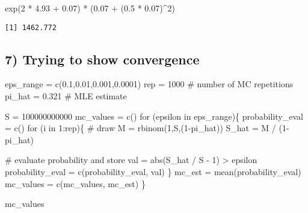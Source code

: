 \documentclass[
  letterpaper,
  DIV=11,
  numbers=noendperiod]{scrartcl}
\newenvironment{Shaded}{\begin{snugshade}}{\end{snugshade}}
\newcommand{\CommentTok}[1]{\textcolor[rgb]{0.37,0.37,0.37}{#1}}
\newcommand{\ControlFlowTok}[1]{\textcolor[rgb]{0.00,0.23,0.31}{#1}}
\newcommand{\DecValTok}[1]{\textcolor[rgb]{0.68,0.00,0.00}{#1}}
\newcommand{\FloatTok}[1]{\textcolor[rgb]{0.68,0.00,0.00}{#1}}
\newcommand{\FunctionTok}[1]{\textcolor[rgb]{0.28,0.35,0.67}{#1}}
\newcommand{\NormalTok}[1]{\textcolor[rgb]{0.00,0.23,0.31}{#1}}
\newcommand{\OtherTok}[1]{\textcolor[rgb]{0.00,0.23,0.31}{#1}}
\newcommand{\SpecialCharTok}[1]{\textcolor[rgb]{0.37,0.37,0.37}{#1}}
\begin{document}
\begin{Shaded}
\begin{Highlighting}[]
\FunctionTok{exp}\NormalTok{(}\DecValTok{2} \SpecialCharTok{*} \FloatTok{4.93} \SpecialCharTok{+} \FloatTok{0.07}\NormalTok{) }\SpecialCharTok{*}\NormalTok{ (}\FloatTok{0.07} \SpecialCharTok{+}\NormalTok{ (}\FloatTok{0.5} \SpecialCharTok{*} \FloatTok{0.07}\NormalTok{)}\SpecialCharTok{\^{}}\DecValTok{2}\NormalTok{)}
\end{Highlighting}
\end{Shaded}

\begin{verbatim}
[1] 1462.772
\end{verbatim}

\hypertarget{trying-to-show-convergence}{%
\subsection{7) Trying to show
convergence}\label{trying-to-show-convergence}}

\begin{Shaded}
\begin{Highlighting}[]
\NormalTok{eps\_range }\OtherTok{=} \FunctionTok{c}\NormalTok{(}\FloatTok{0.1}\NormalTok{,}\FloatTok{0.01}\NormalTok{,}\FloatTok{0.001}\NormalTok{,}\FloatTok{0.0001}\NormalTok{)}
\NormalTok{rep }\OtherTok{=} \DecValTok{1000} \CommentTok{\# number of MC repetitions}
\NormalTok{pi\_hat }\OtherTok{=} \FloatTok{0.321} \CommentTok{\# MLE estimate}

\NormalTok{S }\OtherTok{=} \DecValTok{100000000000}
\NormalTok{mc\_values }\OtherTok{=} \FunctionTok{c}\NormalTok{()}
\ControlFlowTok{for}\NormalTok{ (epsilon }\ControlFlowTok{in}\NormalTok{ eps\_range)\{}
\NormalTok{  probability\_eval }\OtherTok{=} \FunctionTok{c}\NormalTok{()}
  \ControlFlowTok{for}\NormalTok{ (i }\ControlFlowTok{in} \DecValTok{1}\SpecialCharTok{:}\NormalTok{rep)\{}
    \CommentTok{\# draw}
\NormalTok{    M }\OtherTok{=} \FunctionTok{rbinom}\NormalTok{(}\DecValTok{1}\NormalTok{,S,(}\DecValTok{1}\SpecialCharTok{{-}}\NormalTok{pi\_hat))}
\NormalTok{    S\_hat }\OtherTok{=}\NormalTok{ M }\SpecialCharTok{/}\NormalTok{ (}\DecValTok{1}\SpecialCharTok{{-}}\NormalTok{pi\_hat)}
    
    \CommentTok{\# evaluate probability and store }
\NormalTok{    val }\OtherTok{=} \FunctionTok{abs}\NormalTok{(S\_hat }\SpecialCharTok{/}\NormalTok{ S }\SpecialCharTok{{-}} \DecValTok{1}\NormalTok{) }\SpecialCharTok{\textgreater{}}\NormalTok{ epsilon}
\NormalTok{    probability\_eval }\OtherTok{=} \FunctionTok{c}\NormalTok{(probability\_eval, val)}
\NormalTok{  \}}
\NormalTok{  mc\_est }\OtherTok{=} \FunctionTok{mean}\NormalTok{(probability\_eval)}
\NormalTok{  mc\_values }\OtherTok{=} \FunctionTok{c}\NormalTok{(mc\_values, mc\_est)}
\NormalTok{\}}

\NormalTok{mc\_values}
\end{Highlighting}
\end{Shaded}
\end{document}
